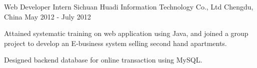 \begin{cventries}
  \cventry
    {Web Developer Intern} %
    {Sichuan Huadi Information Technology Co., Ltd} %
    {Chengdu, China} %
    {May 2012 - July 2012}  %
    {
      \begin{cvitems}
        \item {	Attained systematic training on web application using Java, and joined a group project to develop an E-business system selling second hand apartments.}
        \item {	Designed backend database for online transaction using MySQL.}
      \end{cvitems}
    }
\end{cventries}
